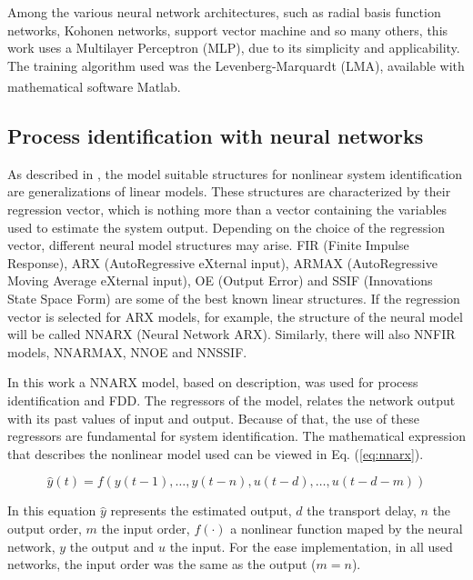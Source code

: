 \documentclass[10pt,fleqn,a4paper]{article}
\newcommand{\parent}[1]{\left(#1\right)}
\newcommand{\reg}{\textsuperscript{\textregistered}}
\begin{document}
Among the various neural network architectures, such as radial basis function
networks, Kohonen networks, support vector machine and so many others, this work
uses a Multilayer Perceptron (MLP), due to its simplicity and applicability.
The training algorithm used was the Levenberg-Marquardt (LMA), available with
mathematical software Matlab\reg.

\subsection{Process identification with neural networks}
As described in \citet{lucena:2005}, the model suitable structures for nonlinear
system identification are generalizations of linear models. These structures are
characterized by their regression vector, which is nothing more than a vector
containing the variables used to estimate the system output. Depending on the
choice of the regression vector, different neural model structures may arise.
FIR (Finite Impulse Response), ARX (AutoRegressive eXternal input), ARMAX
(AutoRegressive Moving Average eXternal input), OE (Output Error) and SSIF
(Innovations State Space Form) are some of the best known linear structures. If
the regression vector is selected for ARX models, for example, the structure of
the neural model will be called NNARX (Neural Network ARX). Similarly, there
will also NNFIR models, NNARMAX, NNOE and NNSSIF.

In this work a NNARX model, based on \citet{norgaard:2000} description, was used
for process identification and FDD. The regressors of the model, relates the
network output with its past values of input and output. Because of that, the
use of these regressors are fundamental for system identification. The
mathematical expression that describes the nonlinear model used can be viewed in
Eq. (\ref{eq:nnarx}).

\begin{equation}
\label{eq:nnarx}
\hat{y}(t) = f\parent{y(t-1), \ldots, y(t-n), u(t-d), \ldots, u(t-d-m)}
\end{equation}

In this equation $\hat{y}$ represents the estimated output, $d$ the transport
delay, $n$ the output order, $m$ the input order, $f(\cdotp)$ a nonlinear
function maped by the neural network, $y$ the output and $u$ the input. For the
ease implementation, in all used networks, the input order was the same as the
output ($m = n$).
\end{document}

